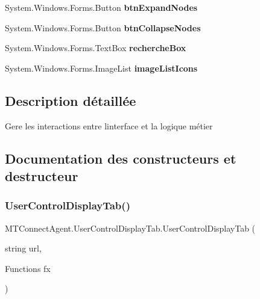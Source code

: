 \begin{DoxyCompactItemize}
\item 
\mbox{\label{class_m_t_connect_agent_1_1_user_control_display_tab_ad2e73116a8315b183e006850caa767ad}} 
System.\+Windows.\+Forms.\+Button {\bfseries btn\+Expand\+Nodes}
\item 
\mbox{\label{class_m_t_connect_agent_1_1_user_control_display_tab_aa39615008797ebe155e99322a8a0e020}} 
System.\+Windows.\+Forms.\+Button {\bfseries btn\+Collapse\+Nodes}
\item 
\mbox{\label{class_m_t_connect_agent_1_1_user_control_display_tab_a789854421cf3f00de88bc6bf168e4ada}} 
System.\+Windows.\+Forms.\+Text\+Box {\bfseries recherche\+Box}
\item 
\mbox{\label{class_m_t_connect_agent_1_1_user_control_display_tab_a4e0ab361176edf2f0a3b1f7bf0fe4f5d}} 
System.\+Windows.\+Forms.\+Image\+List {\bfseries image\+List\+Icons}
\end{DoxyCompactItemize}


\subsection{Description détaillée}
Gere les interactions entre l\textquotesingle{}interface et la logique métier 



\subsection{Documentation des constructeurs et destructeur}
\mbox{\label{class_m_t_connect_agent_1_1_user_control_display_tab_a75f993d745781ea932a201f00bbe150e}} 
\subsubsection{\texorpdfstring{User\+Control\+Display\+Tab()}{UserControlDisplayTab()}}
{\footnotesize\ttfamily M\+T\+Connect\+Agent.\+User\+Control\+Display\+Tab.\+User\+Control\+Display\+Tab (\begin{DoxyParamCaption}\item[{string}]{url,  }\item[{Functions}]{fx }\end{DoxyParamCaption})\hspace{0.3cm}{\ttfamily [inline]}}



